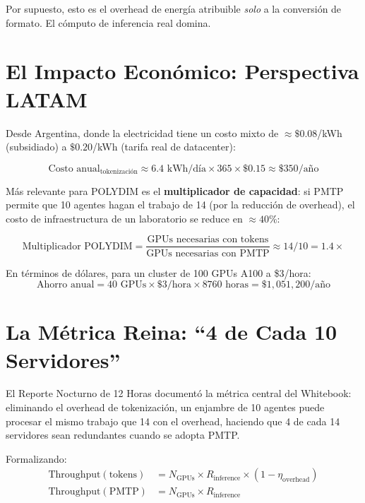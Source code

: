 Por supuesto, esto es el overhead de energía atribuible \textit{solo} a la
conversión de formato. El cómputo de inferencia real domina.

\section{El Impacto Económico: Perspectiva LATAM}

Desde Argentina, donde la electricidad tiene un costo mixto de
$\approx \$0.08$/kWh (subsidiado) a $\$0.20$/kWh (tarifa real de datacenter):

\begin{equation}
\text{Costo anual}_{\text{tokenización}} \approx 6.4 \text{ kWh/día} \times 365 \times \$0.15 \approx \$350/\text{año}
\end{equation}

Más relevante para POLYDIM es el \textbf{multiplicador de capacidad}: si PMTP
permite que 10 agentes hagan el trabajo de 14 (por la reducción de overhead),
el costo de infraestructura de un laboratorio se reduce en $\approx 40\%$:

\begin{equation}
\text{Multiplicador POLYDIM} = \frac{\text{GPUs necesarias con tokens}}{\text{GPUs necesarias con PMTP}} \approx 14/10 = 1.4\times
\end{equation}

En términos de dólares, para un cluster de 100 GPUs A100 a \$3/hora:
\begin{equation}
\text{Ahorro anual} = 40 \text{ GPUs} \times \$3/\text{hora} \times 8760 \text{ horas} = \$1{,}051{,}200/\text{año}
\end{equation}

\section{La Métrica Reina: ``4 de Cada 10 Servidores''}

El Reporte Nocturno de 12 Horas documentó la métrica central del Whitebook:
eliminando el overhead de tokenización, un enjambre de 10 agentes puede procesar
el mismo trabajo que 14 con el overhead, haciendo que 4 de cada 14 servidores
sean redundantes cuando se adopta PMTP.

Formalizando:
\begin{align}
\text{Throughput}(\text{tokens}) &= N_{\text{GPUs}} \times R_{\text{inference}} \times (1 - \eta_{\text{overhead}}) \\
\text{Throughput}(\text{PMTP}) &= N_{\text{GPUs}} \times R_{\text{inference}}
\end{align}


